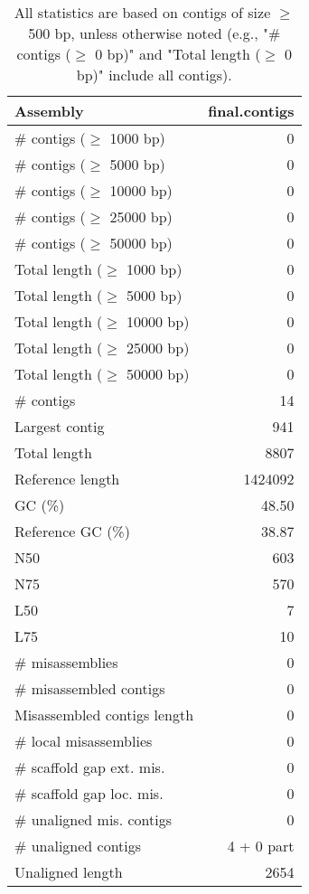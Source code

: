 \documentclass[12pt,a4paper]{article}
\begin{document}
\begin{table}[ht]
\begin{center}
\caption{All statistics are based on contigs of size $\geq$ 500 bp, unless otherwise noted (e.g., "\# contigs ($\geq$ 0 bp)" and "Total length ($\geq$ 0 bp)" include all contigs).}
\begin{tabular}{|l*{1}{|r}|}
\hline
Assembly & final.contigs \\ \hline
\# contigs ($\geq$ 1000 bp) & 0 \\ \hline
\# contigs ($\geq$ 5000 bp) & 0 \\ \hline
\# contigs ($\geq$ 10000 bp) & 0 \\ \hline
\# contigs ($\geq$ 25000 bp) & 0 \\ \hline
\# contigs ($\geq$ 50000 bp) & 0 \\ \hline
Total length ($\geq$ 1000 bp) & 0 \\ \hline
Total length ($\geq$ 5000 bp) & 0 \\ \hline
Total length ($\geq$ 10000 bp) & 0 \\ \hline
Total length ($\geq$ 25000 bp) & 0 \\ \hline
Total length ($\geq$ 50000 bp) & 0 \\ \hline
\# contigs & 14 \\ \hline
Largest contig & 941 \\ \hline
Total length & 8807 \\ \hline
Reference length & 1424092 \\ \hline
GC (\%) & 48.50 \\ \hline
Reference GC (\%) & 38.87 \\ \hline
N50 & 603 \\ \hline
N75 & 570 \\ \hline
L50 & 7 \\ \hline
L75 & 10 \\ \hline
\# misassemblies & 0 \\ \hline
\# misassembled contigs & 0 \\ \hline
Misassembled contigs length & 0 \\ \hline
\# local misassemblies & 0 \\ \hline
\# scaffold gap ext. mis. & 0 \\ \hline
\# scaffold gap loc. mis. & 0 \\ \hline
\# unaligned mis. contigs & 0 \\ \hline
\# unaligned contigs & 4 + 0 part \\ \hline
Unaligned length & 2654 \\ \hline

\end{tabular}
\end{center}
\end{table}
\end{document}
